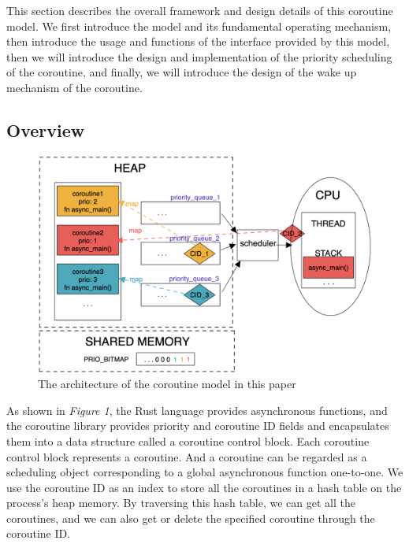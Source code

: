 \documentclass[10pt]{article}
\begin{document}
This section describes the overall framework and design details of this coroutine model. We first introduce the model and its fundamental operating mechanism, then introduce the usage and functions of the interface provided by this model, then we will introduce the design and implementation of the priority scheduling of the coroutine, and finally, we will introduce the design of the wake up mechanism of the coroutine.

\subsection{Overview}

\begin{figure}[ht]
\begin{center}
\includegraphics[width=\columnwidth]{SDSS2021-LaTEX/overview.png}
\caption{The architecture of the coroutine model in this paper}
\label{overview}
\end{center}
\end{figure}

As shown in \textit{Figure 1}, the Rust language provides asynchronous functions, and the coroutine library provides priority and coroutine ID fields and encapsulates them into a data structure called a coroutine control block. Each coroutine control block represents a coroutine. And a coroutine can be regarded as a scheduling object corresponding to a global asynchronous function one-to-one. We use the coroutine ID as an index to store all the coroutines in a hash table on the process's heap memory. By traversing this hash table, we can get all the coroutines, and we can also get or delete the specified coroutine through the coroutine ID. 
\end{document}
